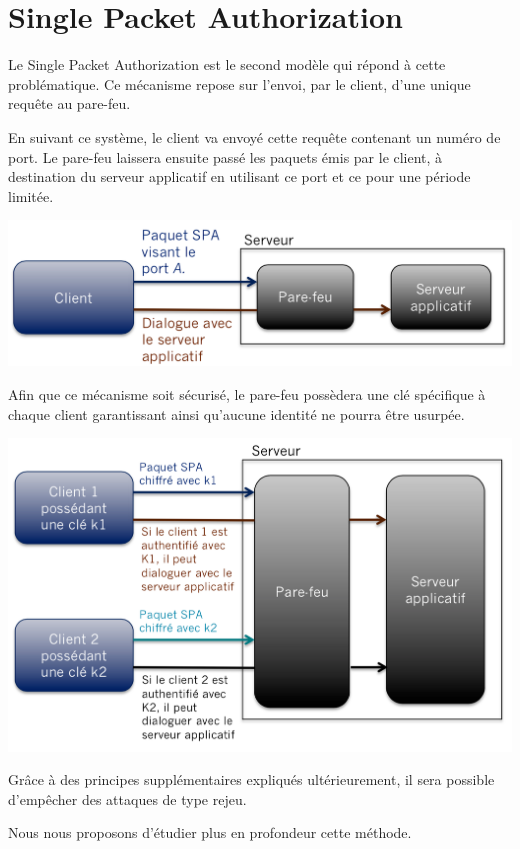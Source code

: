 \chapter{Single Packet Authorization}

Le Single Packet Authorization est le second modèle qui répond à cette problématique. Ce mécanisme repose sur l'envoi, par le client, d'une unique requête au pare-feu.

En suivant ce système, le client va envoyé cette requête contenant un numéro de port. Le pare-feu laissera ensuite passé les paquets émis par le client, à destination du serveur applicatif en utilisant ce port et ce pour une période limitée.

\includegraphics[scale=0.5]{spa_general_1}

Afin que ce mécanisme soit sécurisé, le pare-feu possèdera une clé spécifique à chaque client garantissant ainsi qu'aucune identité ne pourra être usurpée.

\includegraphics[scale=0.5]{spa_general_2}

Grâce à des principes supplémentaires expliqués ultérieurement, il sera possible d'empêcher des attaques de type rejeu.

Nous nous proposons d'étudier plus en profondeur cette méthode.

